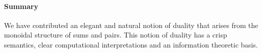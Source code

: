 \documentclass[preprint]{sigplanconf}
\begin{document}

\paragraph*{Summary}
We have contributed an elegant and natural notion of duality that
arises from the monoidal structure of sums and pairs. This notion of
duality has a crisp semantics, clear computational interpretations and
an information theoretic basis. 

\end{document}
